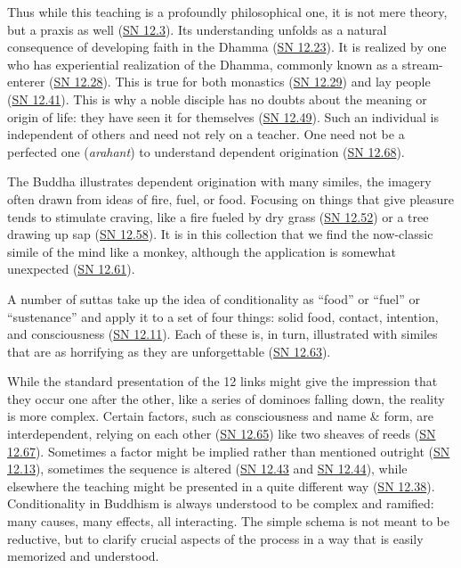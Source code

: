\documentclass[12pt,openany]{book}%
\begin{document}
Thus while this teaching is a profoundly philosophical one, it is not mere theory, but a praxis as well (\href{https://suttacentral.net/sn12.3}{SN 12.3}). Its understanding unfolds as a natural consequence of developing faith in the Dhamma (\href{https://suttacentral.net/sn12.23}{SN 12.23}). It is realized by one who has experiential realization of the Dhamma, commonly known as a stream-enterer (\href{https://suttacentral.net/sn12.28}{SN 12.28}). This is true for both monastics (\href{https://suttacentral.net/sn12.29}{SN 12.29}) and lay people (\href{https://suttacentral.net/sn12.41}{SN 12.41}). This is why a noble disciple has no doubts about the meaning or origin of life: they have seen it for themselves (\href{https://suttacentral.net/sn12.49}{SN 12.49}). Such an individual is independent of others and need not rely on a teacher. One need not be a perfected one (\textit{arahant}) to understand dependent origination (\href{https://suttacentral.net/sn12.68}{SN 12.68}).

The Buddha illustrates dependent origination with many similes, the imagery often drawn from ideas of fire, fuel, or food. Focusing on things that give pleasure tends to stimulate craving, like a fire fueled by dry grass (\href{https://suttacentral.net/sn12.52}{SN 12.52}) or a tree drawing up sap (\href{https://suttacentral.net/sn12.58}{SN 12.58}). It is in this collection that we find the now-classic simile of the mind like a monkey, although the application is somewhat unexpected (\href{https://suttacentral.net/sn12.61}{SN 12.61}).

A number of suttas take up the idea of conditionality as “food” or “fuel” or “sustenance” and apply it to a set of four things: solid food, contact, intention, and consciousness (\href{https://suttacentral.net/sn12.11}{SN 12.11}). Each of these is, in turn, illustrated with similes that are as horrifying as they are unforgettable (\href{https://suttacentral.net/sn12.63}{SN 12.63}).

While the standard presentation of the 12 links might give the impression that they occur one after the other, like a series of dominoes falling down, the reality is more complex. Certain factors, such as consciousness and name \& form, are interdependent, relying on each other (\href{https://suttacentral.net/sn12.65}{SN 12.65}) like two sheaves of reeds (\href{https://suttacentral.net/sn12.67}{SN 12.67}). Sometimes a factor might be implied rather than mentioned outright (\href{https://suttacentral.net/sn12.13}{SN 12.13}), sometimes the sequence is altered (\href{https://suttacentral.net/sn12.43}{SN 12.43} and \href{https://suttacentral.net/sn12.44}{SN 12.44}), while elsewhere the teaching might be presented in a quite different way (\href{https://suttacentral.net/sn12.38}{SN 12.38}). Conditionality in Buddhism is always understood to be complex and ramified: many causes, many effects, all interacting. The simple schema is not meant to be reductive, but to clarify crucial aspects of the process in a way that is easily memorized and understood.
\end{document}
